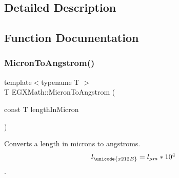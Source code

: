 \subsection{Detailed Description}


\subsection{Function Documentation}
\mbox{\label{group___e_g_x_math-_conversions-_length_conversions-_non-_s_i-_micron-_non-_s_i_ga34f8c07bfb65b584298dd7be114b85ad}} 
\subsubsection{\texorpdfstring{Micron\+To\+Angstrom()}{MicronToAngstrom()}}
{\footnotesize\ttfamily template$<$typename T $>$ \\
T E\+G\+X\+Math\+::\+Micron\+To\+Angstrom (\begin{DoxyParamCaption}\item[{const T}]{length\+In\+Micron }\end{DoxyParamCaption})}



Converts a length in microns to angstroms. \[ l_{\unicode{x212B}}=l_{\mu m} * 10^{4} \]. 

